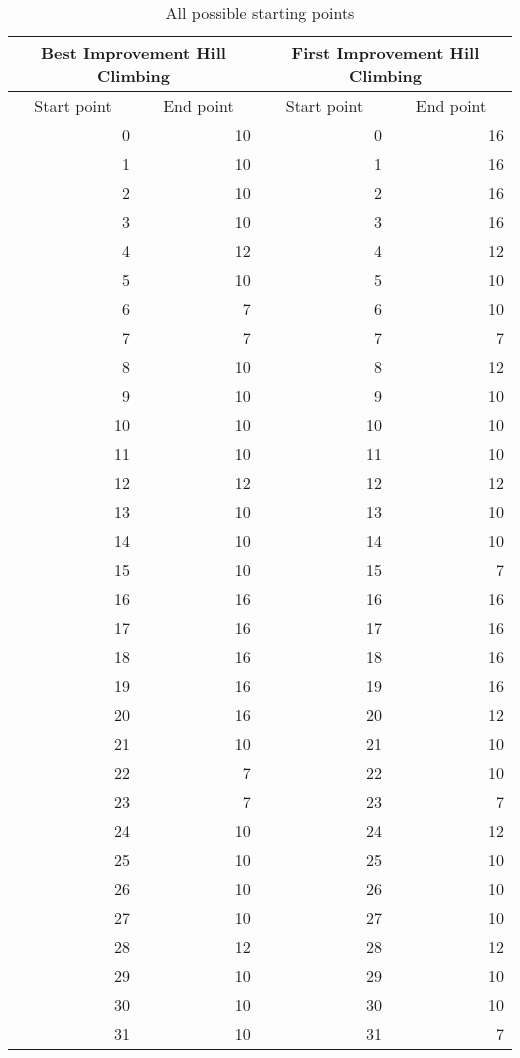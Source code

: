 \documentclass[a4paper]{article}
\begin{document}
\begin{table}[!h]
	\centering
	\caption{All possible starting points}
	\begin{tabular}{|r|r|r|r|}
		 \multicolumn{2}{|c|}{Best Improvement Hill Climbing} & \multicolumn{2}{|c|}{First Improvement Hill Climbing} \\
		\midrule
		\multicolumn{1}{|c|}{Start point} & \multicolumn{1}{c|}{End point} & \multicolumn{1}{c|}{Start point} & \multicolumn{1}{c|}{End point} \\
		\midrule
		0 & 10 & 0 & 16 \\
		\midrule
		1 & 10 & 1 & 16 \\
		\midrule
		2 & 10 & 2 & 16 \\
		\midrule
		3 & 10  & 3 & 16 \\
		\midrule
		4 & 12 & 4 & 12 \\
		\midrule
		5 & 10 & 5 & 10 \\
		\midrule
		6 & 7 & 6 & 10 \\
		\midrule
		7 & 7 & 7 & 7 \\
		\midrule
		8 & 10 & 8 & 12 \\
		\midrule
		9 & 10  & 9 & 10 \\
		\midrule
		10 & 10 & 10 & 10 \\
		\midrule
		11 & 10 & 11 & 10 \\
		\midrule
		12 & 12 & 12 & 12 \\
		\midrule
		13 & 10 & 13 & 10 \\
		\midrule
		14 & 10 & 14 & 10 \\
		\midrule
		15 & 10 & 15 & 7 \\
		\midrule
		16 & 16 & 16 & 16 \\
		\midrule
		17 & 16 & 17 & 16 \\
		\midrule
		18 & 16 & 18 & 16 \\
		\midrule
		19 & 16 & 19 & 16 \\
		\midrule
		20 & 16 & 20 & 12 \\
		\midrule
		21 & 10 & 21 & 10 \\
		\midrule
		22 & 7 & 22 & 10 \\
		\midrule
		23 & 7 & 23 & 7 \\
		\midrule
		24 & 10 & 24 & 12 \\
		\midrule
		25 & 10 & 25 & 10 \\
		\midrule
		26 & 10 & 26 & 10 \\
		\midrule
		27 & 10 & 27 & 10 \\
		\midrule
		28 & 12 & 28 & 12 \\
		\midrule
		29 & 10 & 29 & 10 \\
		\midrule
		30 & 10 & 30 & 10  \\
		\midrule
		31 & 10 & 31 & 7 \\
		\bottomrule
	\end{tabular}%
	\label{tab:addlabel}%
\end{table}%
\end{document}
